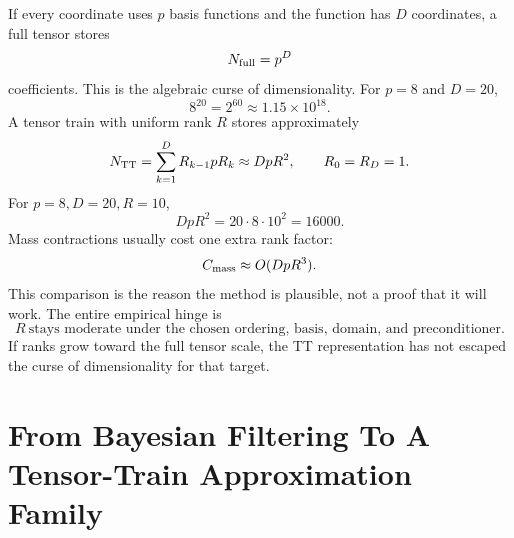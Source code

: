 \documentclass[11pt]{article}
\numberwithin{equation}{section}
\begin{document}
If every coordinate uses \(p\) basis functions and the function has \(D\)
coordinates, a full tensor stores
\begin{equation}
    N_{\rm full}=p^D
    \label{eq:p24-p23-rank1}
\end{equation}
coefficients.  This is the algebraic curse of dimensionality.  For \(p=8\) and
\(D=20\),
\begin{equation}
    8^{20}=2^{60}\approx 1.15\times 10^{18}.
    \label{eq:p24-p23-rank2}
\end{equation}
A tensor train with uniform rank \(R\) stores approximately
\begin{equation}
    N_{\rm TT}
    =
    \sum_{k=1}^D R_{k-1}pR_k
    \approx DpR^2,
    \qquad R_0=R_D=1.
    \label{eq:p24-p23-rank3}
\end{equation}
For \(p=8,D=20,R=10\),
\begin{equation}
    DpR^2=20\cdot 8\cdot 10^2=16000.
    \label{eq:p24-p23-rank4}
\end{equation}
Mass contractions usually cost one extra rank factor:
\begin{equation}
    C_{\rm mass}\approx O(DpR^3).
    \label{eq:p24-p23-rank5}
\end{equation}
This comparison is the reason the method is plausible, not a proof that it
will work.  The entire empirical hinge is
\begin{equation}
    R\ \text{stays moderate under the chosen ordering, basis, domain, and
    preconditioner.}
    \label{eq:p24-p23-rank6}
\end{equation}
If ranks grow toward the full tensor scale, the TT representation has not
escaped the curse of dimensionality for that target.

\section{From Bayesian Filtering To A Tensor-Train Approximation Family}
\end{document}
